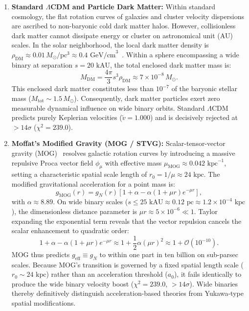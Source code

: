 \documentclass[aps,prd,reprint,superscriptaddress,nofootinbib,floatfix,amsmath,amssymb]{revtex4-2}
\begin{document}
\begin{enumerate}
\item \textbf{Standard $\Lambda$CDM and Particle Dark Matter:}
Within standard cosmology, the flat rotation curves of galaxies and cluster velocity dispersions are ascribed to non-baryonic cold dark matter halos. However, collisionless dark matter cannot dissipate energy or cluster on astronomical unit (AU) scales. In the solar neighborhood, the local dark matter density is $\rho_{\text{DM}} \approx 0.01\,M_\odot/\text{pc}^3 \approx 0.4\text{ GeV/cm}^3$~\cite{gaia2023dr3}. Within a sphere encompassing a wide binary at separation $s = 20\text{ kAU}$, the total enclosed dark matter mass is:
\begin{equation}
M_{\text{DM}} = \frac{4\pi}{3} s^3 \rho_{\text{DM}} \approx 7 \times 10^{-8}\,M_\odot.
\end{equation}
This enclosed dark matter constitutes less than $10^{-7}$ of the baryonic stellar mass ($M_{\text{tot}} \sim 1.5\,M_\odot$). Consequently, dark matter particles exert zero measurable dynamical influence on wide binary orbits. Standard $\Lambda$CDM predicts purely Keplerian velocities ($\tilde{v} = 1.000$) and is decisively rejected at $>14\sigma$ ($\chi^2 = 239.0$).

\item \textbf{Moffat's Modified Gravity (MOG / STVG):}
Scalar-tensor-vector gravity (MOG)~\cite{moffat2006scalar} resolves galactic rotation curves by introducing a massive repulsive Proca vector field $\phi_\mu$ with effective mass $\mu_{\text{MOG}} \approx 0.042\text{ kpc}^{-1}$, setting a characteristic spatial scale length of $r_0 = 1/\mu \approx 24\text{ kpc}$. The modified gravitational acceleration for a point mass is:
\begin{equation}
g_{\text{MOG}}(r) = g_N(r) \left[ 1 + \alpha - \alpha (1 + \mu r) e^{-\mu r} \right],
\end{equation}
with $\alpha \approx 8.89$. On wide binary scales ($s \le 25\text{ kAU} \approx 0.12\text{ pc} \approx 1.2 \times 10^{-4}\text{ kpc}$), the dimensionless distance parameter is $\mu r \approx 5 \times 10^{-6} \ll 1$. Taylor expanding the exponential term reveals that the vector repulsion cancels the scalar enhancement to quadratic order:
\begin{equation}
1 + \alpha - \alpha (1 + \mu r) e^{-\mu r} \approx 1 + \frac{1}{2} \alpha (\mu r)^2 \approx 1 + \mathcal{O}(10^{-10}).
\end{equation}
MOG thus predicts $g_{\text{eff}} \equiv g_N$ to within one part in ten billion on sub-parsec scales. Because MOG's transition is governed by a fixed spatial length scale ($r_0 \sim 24\text{ kpc}$) rather than an acceleration threshold ($a_0$), it fails identically to produce the wide binary velocity boost ($\chi^2 = 239.0$, $>14\sigma$). Wide binaries thereby definitively distinguish acceleration-based theories from Yukawa-type spatial modifications.


\end{enumerate}
\end{document}
